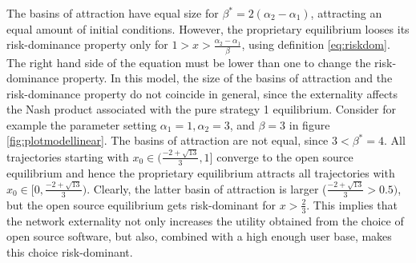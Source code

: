 The basins of attraction have equal size for $\beta^* = 2 (\alpha_2 -\alpha_1)$,
attracting an equal amount of initial conditions. However,
the proprietary equilibrium looses its risk-dominance property 
only for $1 > x > \frac{\alpha_2-\alpha_1}{\beta}  $, using definition 
\ref{eq:riskdom}. The right hand side of the equation must be lower than one 
to change the risk-dominance property. In this model,
the size of the basins of attraction and the risk-dominance
property do not coincide in general, since the externality affects the Nash 
product associated with the pure strategy 1 equilibrium. Consider for example 
the parameter setting $\alpha_1 =1, \alpha_2=3$, and $\beta=3$ in figure 
\ref{fig:plotmodellinear}. 
The basins of attraction are not equal, since $3<\beta^*= 4$. 
All trajectories starting with 
$x_0 \in (\frac{-2+\sqrt{13}}{3},1]$ converge to the open source equilibrium
and hence the proprietary equilibrium attracts
all trajectories with $x_0 \in [0,\frac{-2+\sqrt{13}}{3})$. 
Clearly, the latter basin of 
attraction is larger ($\frac{-2+\sqrt{13}}{3}>0.5)$, 
but the open source equilibrium gets risk-dominant for
$x>\frac 23$. This implies that the network externality not only increases the
utility obtained from the choice of open source software, but also,
combined with a high enough user base, makes this choice risk-dominant. 

